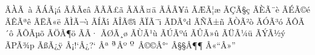 \def\tura#1{{\edef\scf@{\the\scriptfont\fam}%
 \ifdim\fontdimen6\scf@=0pt\else\scf@\fi $^{\hbox{\b{#1}}}$}}

\def\do#1#2{\expandafter\def
 \csname\string^^c2\string#1@tex\endcsname{\string#1}}\doutfA

\def\dotexA{%
 \do^^c3^^80{\`A}\do^^c3^^a0{\`a}%
 \do^^c3^^81{\'A}\do^^c3^^a1{\'a}%
 \do^^c3^^82{\^A}\do^^c3^^a2{\^a}%
 \do^^c3^^83{\~A}\do^^c3^^a3{\~a}%
 \do^^c3^^84{\"A}\do^^c3^^a4{\"a}%
 \do^^c3^^85{\AA}\do^^c3^^a5{\aa}%
 \do^^c3^^86{\AE}\do^^c3^^a6{\ae}%
 \do^^c3^^87{\c C}\do^^c3^^a7{\c c}%
 \do^^c3^^88{\`E}\do^^c3^^a8{\`e}%
 \do^^c3^^89{\'E}\do^^c3^^a9{\'e}%
 \do^^c3^^8a{\^E}\do^^c3^^aa{\^e}%
 \do^^c3^^8b{\"E}\do^^c3^^ab{\"e}%
 \do^^c3^^8c{\`I}\do^^c3^^ac{\`\i}%
 \do^^c3^^8d{\'I}\do^^c3^^ad{\'\i}%
 \do^^c3^^8e{\^I}\do^^c3^^ae{\^\i}%
 \do^^c3^^8f{\"I}\do^^c3^^af{\"\i}%
 \do^^c3^^90{D}\do^^c3^^b0{d}%
 \do^^c3^^91{\~N}\do^^c3^^b1{\~n}%
 \do^^c3^^92{\`O}\do^^c3^^b2{\`o}%
 \do^^c3^^93{\'O}\do^^c3^^b3{\'o}%
 \do^^c3^^94{\^O}\do^^c3^^b4{\^o}%
 \do^^c3^^95{\~O}\do^^c3^^b5{\~o}%
 \do^^c3^^96{\"O}\do^^c3^^b6{\"o}%
 \do^^c3^^97{\times}\do^^c3^^b7{\div}%
 \do^^c3^^98{\O}\do^^c3^^b8{\o}%
 \do^^c3^^99{\`U}\do^^c3^^b9{\`u}%
 \do^^c3^^9a{\'U}\do^^c3^^ba{\'u}%
 \do^^c3^^9b{\^U}\do^^c3^^bb{\^u}%
 \do^^c3^^9c{\"U}\do^^c3^^bc{\"u}%
 \do^^c3^^9d{\'Y}\do^^c3^^bd{\'y}
 \do^^c3^^9e{P}\do^^c3^^be{p}%
 \do^^c3^^9f{\ss}\do^^c3^^bf{\"y}%
 \do^^c2^^a1{!`}\do^^c2^^bf{?`}%
 \do^^c2^^aa{\tura a}\do^^c2^^ba{\tura o}%
 \do^^c2^^a9{\copyright}\do^^c2^^b0{$^\circ$}%
 \do^^c2^^a7{\S}\do^^c2^^b6{\P}%
 \do^^c2^^ab{``}\do^^c2^^bb{''}%
}

\def\do#1#2#3{\expandafter\def
 \csname\string#1\string#2@tex\endcsname{#3}}\dotexA

\def\doutfB{%
 \do^^e2^^80^^92%
 \do^^e2^^80^^93%
 \do^^e2^^80^^94%
 \do^^e2^^80^^98%
 \do^^e2^^80^^99%
 \do^^e2^^80^^9a%
 \do^^e2^^80^^9c%
 \do^^e2^^80^^9d%
 \do^^e2^^80^^9e%
 \do^^e2^^80^^a0%
 \do^^e2^^80^^a1%
 \do^^e2^^80^^a6%
 \do^^e2^^80^^b0%
 \do^^e2^^80^^b9%
 \do^^e2^^80^^ba%
 \do^^e2^^82^^ac%
}

